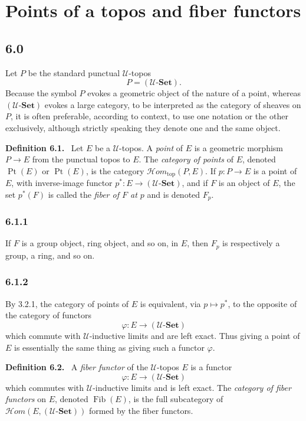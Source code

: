 \documentclass[11pt]{article}
\newcommand{\U}{\mathcal{U}}
\newcommand{\Set}{\mathbf{Set}}
\newcommand{\Ppoint}{\operatorname{Pt}}
\newcommand{\Ffib}{\operatorname{Fib}}
\newcommand{\Hhom}{\mathcal{H}om}
\newcommand{\Hhomtop}{\mathcal{H}om_{\mathrm{top}}}
\newenvironment{statement}[1]{\par\medskip\noindent\textbf{#1.}\ }{\par\medskip}
\begin{document}
\section{Points of a topos and fiber functors}

\subsection*{6.0}
Let \(P\) be the standard punctual \(\U\)-topos
\[
P=(\U\text{-}\Set).
\]
Because the symbol \(P\) evokes a geometric object of the nature of a point, whereas \((\U\text{-}\Set)\) evokes a large category, to be interpreted as the category of sheaves on \(P\), it is often preferable, according to context, to use one notation or the other exclusively, although strictly speaking they denote one and the same object.

\begin{statement}{Definition 6.1}
Let \(E\) be a \(\U\)-topos. A \emph{point} of \(E\) is a geometric morphism \(P\to E\) from the punctual topos to \(E\). The \emph{category of points} of \(E\), denoted \(\Ppoint(E)\) or \(\operatorname{Pt}(E)\), is the category \(\Hhomtop(P,E)\). If \(p:P\to E\) is a point of \(E\), with inverse-image functor \(p^*:E\to(\U\text{-}\Set)\), and if \(F\) is an object of \(E\), the set \(p^*(F)\) is called the \emph{fiber of \(F\) at \(p\)} and is denoted \(F_p\).
\end{statement}

\subsubsection*{6.1.1}
If \(F\) is a group object, ring object, and so on, in \(E\), then \(F_p\) is respectively a group, a ring, and so on.

\subsubsection*{6.1.2}
By 3.2.1, the category of points of \(E\) is equivalent, via \(p\mapsto p^*\), to the opposite of the category of functors
\[
\varphi:E\longrightarrow (\U\text{-}\Set)
\]
which commute with \(\U\)-inductive limits and are left exact. Thus giving a point of \(E\) is essentially the same thing as giving such a functor \(\varphi\).

\begin{statement}{Definition 6.2}
A \emph{fiber functor} of the \(\U\)-topos \(E\) is a functor
\[
\varphi:E\longrightarrow(\U\text{-}\Set)
\]
which commutes with \(\U\)-inductive limits and is left exact. The \emph{category of fiber functors} on \(E\), denoted \(\Ffib(E)\), is the full subcategory of \(\Hhom(E,(\U\text{-}\Set))\) formed by the fiber functors.
\end{statement}
\end{document}
